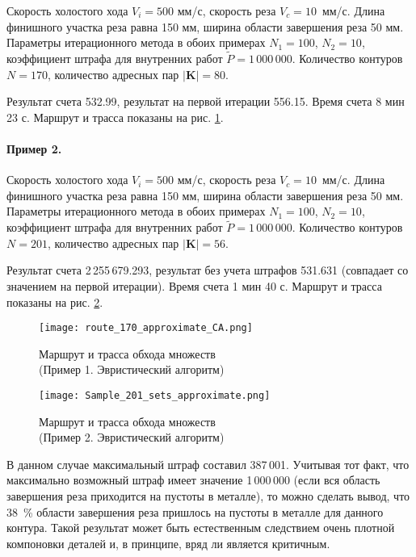 Скорость холостого хода $V_i=500$ мм/с,
скорость реза $V_c=10$~мм/с.
Длина финишного участка реза равна 150 мм,
ширина области завершения реза 50 мм.
Параметры итерационного метода в обоих примерах
$N_1=100$, $N_2=10$,
коэффициент штрафа для внутренних работ
$\tilde{P}=1\,000\,000$.
Количество контуров $N=170$,
количество адресных пар $|\mathbf{K}|=80$.

Результат счета 532.99,
результат на первой итерации 556.15.
Время счета 8 мин 23 с.
Маршрут и трасса показаны на рис. \ref{Sample1Heuristic}.

\paragraph*{Пример 2.}

Скорость холостого хода $V_i=500$ мм/с,
скорость реза $V_c=10$~мм/с.
Длина финишного участка реза равна 150 мм,
ширина области завершения реза 50 мм.
Параметры итерационного метода в обоих примерах
$N_1=100$, $N_2=10$,
коэффициент штрафа для внутренних работ
$\tilde{P}=1\,000\,000$.
Количество контуров $N=201$,
количество адресных пар $|\mathbf{K}|=56$.

Результат счета 2\,255\,679.293,
результат без учета штрафов 531.631
(совпадает со значением на первой итерации).
Время счета 1 мин 40 с.
Маршрут и трасса показаны на рис. \ref{Sample2Heuristic}.

\begin{figure}[H]
  \centering
  \texttt{[image: route\_170\_approximate\_CA.png]}
  \caption{
    Маршрут и трасса обхода множеств \\
    (Пример 1. Эвристический алгоритм)
    }
  \label{Sample1Heuristic}
\end{figure}

\begin{figure}[H]
  \centering
  \texttt{[image: Sample\_201\_sets\_approximate.png]}
  \caption{
    Маршрут и трасса обхода множеств\\
    (Пример 2. Эвристический алгоритм)
    }
  \label{Sample2Heuristic}
\end{figure}

В данном случае максимальный штраф составил 387\,001.
Учитывая тот факт, что максимально возможный штраф имеет значение 1\,000\,000
(если вся область завершения реза приходится на пустоты в металле),
то можно сделать вывод, что 38~\% области
завершения реза пришлось на пустоты в металле для данного контура.
Такой результат может быть естественным следствием очень плотной компоновки деталей
и, в принципе, вряд ли является критичным.

